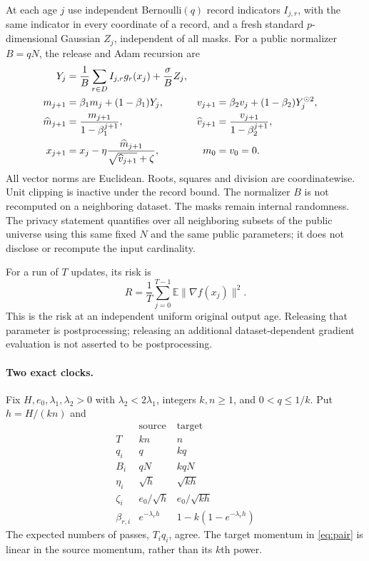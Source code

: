 \documentclass[a4paper,11pt]{article}
\theoremstyle{remark}
\newcommand{\E}{\mathbb E}
\newcommand{\norm}[1]{\lVert#1\rVert}
\begin{document}
At each age $j$ use independent Bernoulli$(q)$ record indicators $I_{j,r}$,
with the same indicator in every coordinate of a record, and a fresh standard
$p$-dimensional Gaussian $Z_j$, independent of all masks. For a public
normalizer $B=qN$, the release and Adam recursion are
\begin{align}
 Y_j&=\frac1B\sum_{r\in D}I_{j,r}g_r(x_j)+\frac\sigma B Z_j,
       \label{eq:release}\\
 m_{j+1}&=\beta_1m_j+(1-\beta_1)Y_j,&
 v_{j+1}&=\beta_2v_j+(1-\beta_2)Y_j^{\odot2},\notag\\
 \widehat m_{j+1}&=\frac{m_{j+1}}{1-\beta_1^{j+1}},&
 \widehat v_{j+1}&=\frac{v_{j+1}}{1-\beta_2^{j+1}},\notag\\
 x_{j+1}&=x_j-\eta\frac{\widehat m_{j+1}}
                         {\sqrt{\widehat v_{j+1}}+\zeta},&m_0&=v_0=0.
       \label{eq:adam}
\end{align}
All vector norms are Euclidean. Roots, squares and division are coordinatewise. Unit clipping is inactive
under the record bound. The normalizer $B$ is not recomputed on a neighboring
dataset. The masks remain internal randomness.
The privacy statement quantifies over all neighboring subsets of the public
universe using this same fixed $N$ and the same public parameters; it does
not disclose or recompute the input cardinality.

For a run of $T$ updates, its risk is
\begin{equation}\label{eq:risk}
 R=\frac1T\sum_{j=0}^{T-1}\E\norm{\nabla f(x_j)}^2.
\end{equation}
This is the risk at an independent uniform original output age. Releasing
that parameter is postprocessing; releasing an additional dataset-dependent
gradient evaluation is not asserted to be postprocessing.

\paragraph{Two exact clocks.}
Fix $H,e_0,\lambda_1,\lambda_2>0$ with $\lambda_2<2\lambda_1$,
integers $k,n\ge1$, and $0<q\le1/k$. Put $h=H/(kn)$ and
\begin{equation}\label{eq:pair}
\begin{array}{c|cc}
 &\text{source}&\text{target}\\ \hline
 T&kn&n\\
 q_i&q&kq\\
 B_i&qN&kqN\\
 \eta_i&\sqrt h&\sqrt{kh}\\
 \zeta_i&e_0/\sqrt h&e_0/\sqrt{kh}\\
 \beta_{r,i}&e^{-\lambda_rh}&1-k(1-e^{-\lambda_rh})
\end{array}
\end{equation}
The expected numbers of passes, $T_iq_i$, agree. The target momentum in
\eqref{eq:pair} is linear in the source momentum, rather than its $k$th power.
\end{document}

